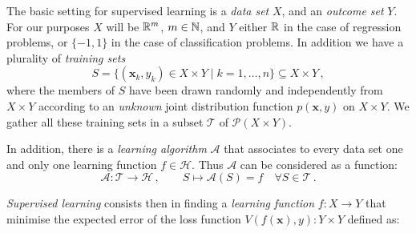 %
%
%
%
%
%
%

The basic setting for supervised learning is a {\em data set\/} $X$, 
and an  {\em outcome set\/} $Y$.
For our purposes $X$ will be ${\mathbb R }^m$, $m\in{\mathbb N }$, and $Y$ either ${\mathbb R }$
in the case of regression problems, or $\{-1,1\}$ in the case of
classification problems.
In addition we have a plurality of {\em training sets\/}
$$
S=\bigg\{ (\mathbf{x}_k,y_k)\in X\times Y \mid k=1,\dots,n \bigg\}
\subseteq X\times Y\,,
$$
where the members of $S$ have been drawn randomly and independently
from $X\times Y$ according to an {\em unknown\/} joint distribution
function $p(\mathbf{x},y)$ on $X\times Y$.
We gather all these training sets in a subset $\mathscr{T}$ of
$\mathscr{P}(X\times Y)$.

In addition, there is a {\em learning algorithm\/} $\mathcal{A}$ that
associates to every data set one and only one learning function
$f\in\mathscr{H}$.
Thus $\mathcal{A}$ can be considered as a function:
$$
\mathcal{A}:\mathscr{T}\to\mathscr{H}\,,\qquad
S\mapsto\mathcal{A}(S)=f\quad\forall S\in\mathscr{T}\,.
$$ 

{\em Supervised learning\/} consists then in finding a {\em learning function\/}
$f:X\to Y$ that minimise the expected error of the loss function $V(f(\mathbf{x}),y): Y
\times Y$ defined as:


